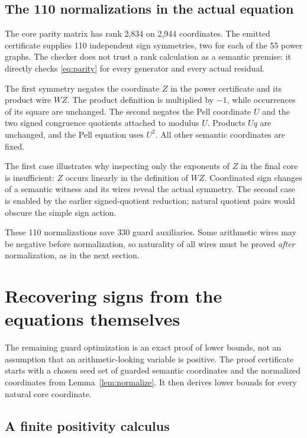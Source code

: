 \documentclass[11pt,letterpaper]{article}
\theoremstyle{definition}
\begin{document}
\subsection{The 110 normalizations in the actual equation}

The core parity matrix has rank 2,834 on 2,944 coordinates. The emitted
certificate supplies 110 independent sign symmetries, two for each of
the 55 power graphs. The checker does not trust a rank calculation as a
semantic premise: it directly checks \eqref{eq:parity} for every
generator and every actual residual.

The first symmetry negates the coordinate $Z$ in the power certificate
and its product wire $WZ$. The product definition is multiplied by
$-1$, while occurrences of its square are unchanged. The second
negates the Pell coordinate $U$ and the two signed congruence quotients
attached to modulus $U$. Products $Uq$ are unchanged, and the Pell
equation uses $U^2$. All other semantic coordinates are fixed.

The first case illustrates why inspecting only the exponents of $Z$
in the final core is insufficient: $Z$ occurs linearly in the
definition of $WZ$. Coordinated sign changes of a semantic witness and
its wires reveal the actual symmetry. The second case is enabled by
the earlier signed-quotient reduction; natural quotient pairs would
obscure the simple sign action.

These 110 normalizations save 330 guard auxiliaries. Some arithmetic
wires may be negative before normalization, so naturality of all wires
must be proved \emph{after} normalization, as in the next section.

\section{Recovering signs from the equations themselves}
\label{sec:bounds}

The remaining guard optimization is an exact proof of lower bounds,
not an assumption that an arithmetic-looking variable is positive.
The proof certificate starts with a chosen seed set of guarded
semantic coordinates and the normalized coordinates from
Lemma~\ref{lem:normalize}. It then derives lower bounds for every
natural core coordinate.

\subsection{A finite positivity calculus}
\end{document}

